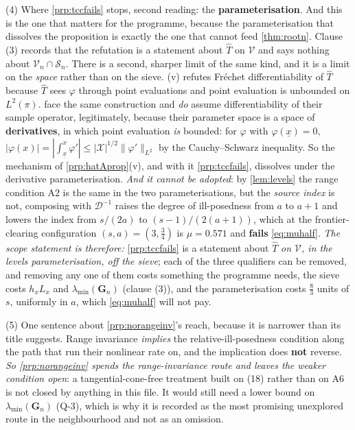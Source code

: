 \begin{remark}
(4) Where \cref{prp:tccfails} stops, second reading: the \textbf{parameterisation}. And this is the
one that matters for the programme, because the parameterisation that dissolves the proposition is exactly
the one that cannot feed \cref{thm:rootn}. Clause (3) records that the refutation is a statement about
$\hat T$ on $\mathcal V$ and says nothing about $\mathcal V_n\cap\mathcal S_n$. There is a second,
sharper limit of the same kind, and it is a limit on the \emph{space} rather than on the sieve.
(v) refutes Fr\'echet differentiability of $\hat T$ because $\hat T$ sees $\varphi$
through point evaluations and point evaluation is unbounded on $L^{2}(\pi)$.
\citet{centorrinofeveflorens2019} face the same construction and \emph{do} assume differentiability of
their sample operator, legitimately, because their parameter space is a space of \textbf{derivatives}, in
which point evaluation \emph{is} bounded: for $\varphi$ with $\varphi(\underline x)=0$,
$|\varphi(x)|=|\int_{\underline x}^{x}\varphi'|\le|\mathcal X|^{1/2}\|\varphi'\|_{L^{2}}$ by the
Cauchy--Schwarz inequality. So the mechanism of \cref{prp:hatAprop}(v), and with it
\cref{prp:tccfails}, dissolves under the derivative parameterisation. \emph{And it cannot be adopted}: by
\cref{lem:levels} the range condition A2 is the same in the two parameterisations, but the \emph{source
index} is not, composing with $\mathcal D^{-1}$ raises the degree of ill-posedness from $a$ to $a+1$ and
lowers the index from $s/(2a)$ to $(s-1)/(2(a+1))$, which at the frontier-clearing configuration
$(s,a)=(3,\tfrac34)$ is $\mu=0.571$ and \textbf{fails} \eqref{eq:muhalf}. \emph{The scope statement is
therefore:} \cref{prp:tccfails} is a
statement about $\hat T$ \emph{on $\mathcal V$, in the levels parameterisation, off the sieve}; each of the
three qualifiers can be removed, and removing any one of them costs something the programme needs, the
sieve costs $h_xL_x$ and $\lambda_{\min}(\mathbf G_n)$ (clause (3)), and the parameterisation costs
$\tfrac83$ units of $s$, uniformly in $a$, which \eqref{eq:muhalf} will not pay.

(5) One sentence about \cref{prp:norangeinv}'s reach, because it is narrower than its title
suggests. Range invariance \emph{implies} the relative-ill-posedness condition along the path that
\citet[Assumption (18)]{centorrinofeveflorens2019} run their nonlinear rate on, and the implication does
\textbf{not} reverse. \emph{So \cref{prp:norangeinv} spends the range-invariance route and leaves the
weaker condition open}: a tangential-cone-free treatment built on (18) rather than on A6 is not closed by
anything in this file. It would still need a lower bound on $\lambda_{\min}(\mathbf G_n)$ (Q-3), which is
why it is recorded as the most promising unexplored route in the neighbourhood and not as an omission.
\end{remark}

